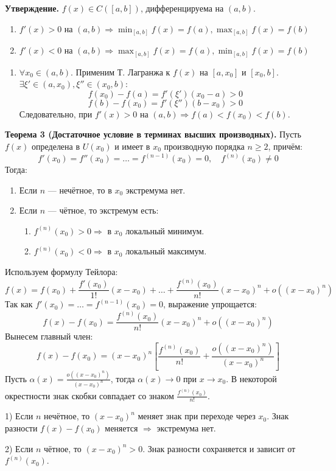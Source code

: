\documentclass[12pt, a4paper]{article}
\begin{document}
\textbf{Утверждение.} $f(x) \in C([a, b])$, дифференцируема на $(a, b)$.
\begin{enumerate}
	\item $f'(x) > 0$ на $(a, b) \Rightarrow \min_{[a, b]} f(x) = f(a), \max_{[a, b]} f(x) = f(b)$
	\item $f'(x) < 0$ на $(a, b) \Rightarrow \max_{[a, b]} f(x) = f(a), \min_{[a, b]} f(x) = f(b)$
\end{enumerate}
\begin{tcolorbox}[title=Доказательство]
	\begin{enumerate}
		\item $\forall x_0 \in (a, b)$. Применим Т. Лагранжа к $f(x)$ на $[a, x_0]$ и $[x_0, b]$. $\exists \xi' \in (a, x_0), \xi'' \in (x_0, b)$:
			\[ f(x_0) - f(a) =f'(\xi')(x_0 - a) > 0 \]
			\[ f(b) - f(x_0) =f'(\xi'')(b - x_0) > 0\]
		Следовательно, при $f'(x) > 0$ на $(a, b) \Rightarrow f(a) < f(x_0) < f(b)$.
	\end{enumerate}
\end{tcolorbox}

\textbf{Теорема 3 (Достаточное условие в терминах высших производных).} 
Пусть $f(x)$ определена в $U(x_0)$ и имеет в $x_0$ производную порядка $n \geq 2$, причём:
\[ f'(x_0) = f''(x_0) = \dots  = f^{(n - 1)}(x_0) = 0, \quad f^{(n)}(x_0) \not= 0\]
Тогда:
\begin{enumerate}
	\item Если $n$ — нечётное, то в $x_0$ экстремума нет. 
	\item Если $n$ — чётное, то экстремум есть:
		\begin{enumerate}
			\item $f^{(n)}(x_0) > 0 \Rightarrow$ в $x_0$ локальный минимум.
			\item $f^{(n)}(x_0) < 0 \Rightarrow$ в $x_0$ локальный максимум.
		\end{enumerate}
\end{enumerate}
\begin{tcolorbox}[title=Доказательство (через формулу Тейлора с остатком Пеано)]
	Используем формулу Тейлора:
	\[ f(x) = f(x_0) + \frac{f'(x_0)}{1!}(x-x_0) + \dots + \frac{f^{(n)}(x_0)}{n!}(x-x_0)^n + o((x-x_0)^n) \]
	Так как $f'(x_0) = \dots = f^{(n-1)}(x_0) = 0$, выражение упрощается:
	\[ f(x) - f(x_0) = \frac{f^{(n)}(x_0)}{n!}(x-x_0)^n + o((x-x_0)^n) \]
	Вынесем главный член:
	\[ f(x) - f(x_0) = (x-x_0)^n \left[ \frac{f^{(n)}(x_0)}{n!} + \frac{o((x-x_0)^n)}{(x-x_0)^n} \right] \]
	Пусть $\alpha(x) = \frac{o((x-x_0)^n)}{(x-x_0)^n}$, тогда $\alpha(x) \to 0$ при $x \to x_0$.
	В некоторой окрестности знак скобки совпадает со знаком $\frac{f^{(n)}(x_0)}{n!}$.
	
	1) Если $n$ нечётное, то $(x-x_0)^n$ меняет знак при переходе через $x_0$. Знак разности $f(x)-f(x_0)$ меняется $\Rightarrow$ экстремума нет.
	
	2) Если $n$ чётное, то $(x-x_0)^n > 0$. Знак разности сохраняется и зависит от $f^{(n)}(x_0)$.
\end{tcolorbox}
\end{document}

